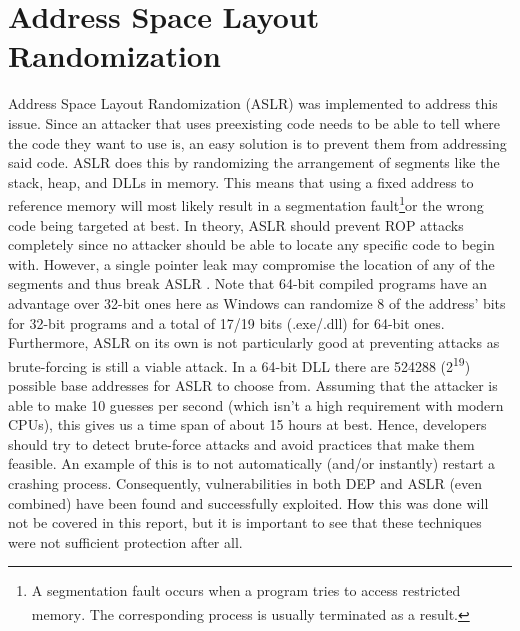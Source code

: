 \documentclass[10pt,twocolumn,a4paper]{article}
\begin{document}
\section{Address Space Layout Randomization}\label{sec:ASLR}
Address Space Layout Randomization (ASLR) was implemented to address this issue.
Since an attacker that uses preexisting code needs to be able to tell where the code they want to use is, an easy solution is to prevent them from addressing said code.
ASLR does this by randomizing the arrangement of segments like the stack, heap, and DLLs in memory\cite{ASLR}. This means that using a fixed address to reference memory will most likely result in a segmentation fault\footnote{A segmentation fault occurs when a program tries to access restricted memory\textsuperscript{\cite{SegFault}}. The corresponding process is usually terminated as a result.}or the wrong code being targeted at best.
In theory, ASLR should prevent ROP attacks completely since no attacker should be able to locate any specific code to begin with.
However, a single pointer leak may compromise the location of any of the segments and thus break ASLR \cite{bypass}. Note that 64-bit compiled programs have an advantage over 32-bit ones here as Windows can randomize 8 of the address' bits for 32-bit programs and a total of 17/19 bits (.exe/.dll) for 64-bit ones.\cite{ASLRBits2}
Furthermore, ASLR on its own is not particularly good at preventing attacks as brute-forcing is still a viable attack. In a 64-bit DLL there are 524288 (2\textsuperscript{19}) possible base addresses for ASLR to choose from\cite{ASLRBits}. Assuming that the attacker is able to make 10 guesses per second (which isn't a high requirement with modern CPUs), this gives us a time span of about 15 hours at best.
Hence, developers should try to detect brute-force attacks and avoid practices that make them feasible. An example of this is to not automatically (and/or instantly) restart a crashing process\cite{ASLRBits}.
Consequently, vulnerabilities in both DEP and ASLR (even combined) have been found and successfully exploited\cite{bypass}\cite{ASLRBits2}.
How this was done will not be covered in this report, but it is important to see that these techniques were not sufficient protection after all.
\end{document}

